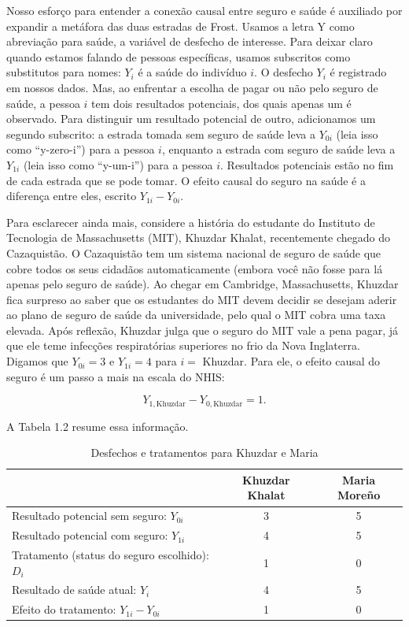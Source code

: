 \documentclass[a4paper,12pt]{article}[abntex2]
\begin{document}
Nosso esforço para entender a conexão causal entre seguro e saúde é auxiliado por expandir a metáfora das duas estradas de Frost. Usamos a letra Y como abreviação para saúde, a variável de desfecho de interesse. Para deixar claro quando estamos falando de pessoas específicas, usamos subscritos como substitutos para nomes: \( Y_i \) é a saúde do indivíduo \( i \). O desfecho \( Y_i \) é registrado em nossos dados. Mas, ao enfrentar a escolha de pagar ou não pelo seguro de saúde, a pessoa \( i \) tem dois resultados potenciais, dos quais apenas um é observado. Para distinguir um resultado potencial de outro, adicionamos um segundo subscrito: a estrada tomada sem seguro de saúde leva a \( Y_{0i} \) (leia isso como “y-zero-i”) para a pessoa \( i \), enquanto a estrada com seguro de saúde leva a \( Y_{1i} \) (leia isso como “y-um-i”) para a pessoa \( i \). Resultados potenciais estão no fim de cada estrada que se pode tomar. O efeito causal do seguro na saúde é a diferença entre eles, escrito \( Y_{1i} - Y_{0i} \).

Para esclarecer ainda mais, considere a história do estudante do Instituto de Tecnologia de Massachusetts (MIT), Khuzdar Khalat, recentemente chegado do Cazaquistão. O Cazaquistão tem um sistema nacional de seguro de saúde que cobre todos os seus cidadãos automaticamente (embora você não fosse para lá apenas pelo seguro de saúde). Ao chegar em Cambridge, Massachusetts, Khuzdar fica surpreso ao saber que os estudantes do MIT devem decidir se desejam aderir ao plano de seguro de saúde da universidade, pelo qual o MIT cobra uma taxa elevada. Após reflexão, Khuzdar julga que o seguro do MIT vale a pena pagar, já que ele teme infecções respiratórias superiores no frio da Nova Inglaterra. Digamos que \( Y_{0i} = 3 \) e \( Y_{1i} = 4 \) para \( i = \) Khuzdar. Para ele, o efeito causal do seguro é um passo a mais na escala do NHIS:

\begin{equation}
Y_{1,\text{Khuzdar}} - Y_{0,\text{Khuzdar}} = 1.
\end{equation}

A Tabela 1.2 resume essa informação.

\begin{table}[h]
\centering
\caption{Desfechos e tratamentos para Khuzdar e Maria}
\begin{tabular}{lcc}
\hline
 & \textbf{Khuzdar Khalat} & \textbf{Maria Moreño} \\
\hline
Resultado potencial sem seguro: \(Y_{0i}\) & 3 & 5 \\
Resultado potencial com seguro: \(Y_{1i}\) & 4 & 5 \\
Tratamento (status do seguro escolhido): \(D_i\) & 1 & 0 \\
Resultado de saúde atual: \(Y_i\) & 4 & 5 \\
Efeito do tratamento: \(Y_{1i} - Y_{0i}\) & 1 & 0 \\
\hline
\end{tabular}
\end{table}
\end{document}
